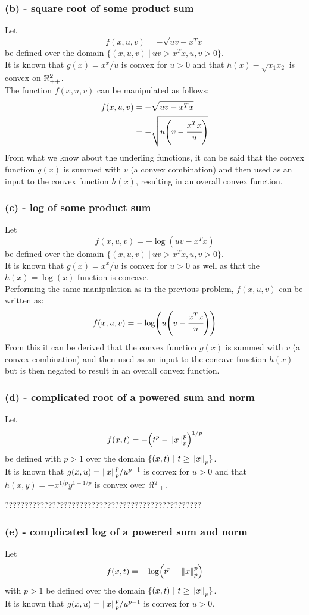 \documentclass[letter]{article}
\begin{document}
\subsubsection{(b) - square root of some product sum}
Let $$f(x,u,v) = - \sqrt{uv - x^T x}$$ be defined over the domain $\{(x,u,v) \ | \ uv > x^T x, u, v > 0\}$.\\
It is known that $g(x) = x^x / u$ is convex for $u>0$ and that $h(x)-\sqrt{x_1 x_2}$ is convex on $\real_{++}^2$.\\
The function $f(x,u,v)$ can be manipulated as follows:
\begin{align*}
	f(x,u,v) 	&= - \sqrt{uv - x^T x}\\
				&= - \sqrt{u \qty(v -\cfrac{x^T x}{u})}
\end{align*}
From what we know about the underling functions, it can be said that the convex function $g(x)$ is summed with $v$ (a convex combination) and then used as an input to the convex function $h(x)$, resulting in an overall convex function.

\subsubsection{(c) - log of some product sum}
Let $$f(x,u,v) = - \log(uv - x^T x)$$ be defined over the domain $\{(x,u,v) \ | \ uv > x^T x, u, v > 0\}$.\\
It is known that $g(x) = x^x / u$ is convex for $u>0$ as well as that the $h(x) = \log(x)$ function is concave.\\
Performing the same manipulation as in the previous problem, $f(x,u,v)$ can be written as: $$f(x,u,v) = -\log(u \qty(v - \cfrac{x^Tx}{u}))$$
From this it can be derived that the convex function $g(x)$ is summed with $v$ (a convex combination) and then used as an input to the concave function $h(x)$ but is then negated to result in an overall convex function.


\subsubsection{(d) - complicated root of a powered sum and norm}
Let $$ f(x,t) = -\qty(t^p - \norm{x}_p^p)^{1/p}$$ be defined with $p>1$ over the domain $\{(x,t) \ | \ t \geq \norm{x}_p\}$.\\
It is known that $g(x,u) = \norm{x}_p^p / u^{p-1}$ is convex for $u >0$ and that $h(x,y) = -x^{1/p} y^{1 - 1/p}$ is convex over $\real_{++}^2$.

??????????????????????????????????????????????????


\subsubsection{(e) - complicated log of a powered sum and norm}
Let $$ f(x,t) = - \log(t^p - \norm{x}_p^p)$$ with $p >1$ be defined over the domain $\{(x,t) \ | \ t \geq \norm{x}_p\}$.\\
It is known that $g(x,u) = \norm{x}_p^p / u^{p-1}$ is convex for $u > 0$.
\end{document}
